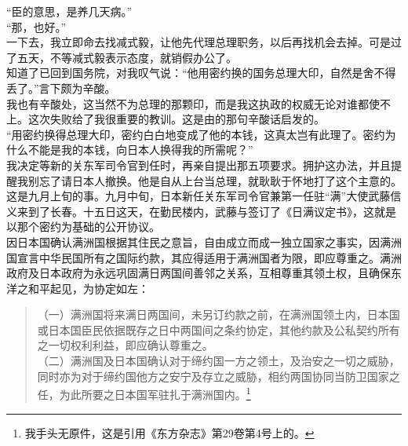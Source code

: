 “臣的意思，是养几天病。”\\

“那，也好。”\\

一下去，我立即命去找减式毅，让他先代理总理职务，以后再找机会去掉。可是过了五天，不等减式毅表示态度，就销假办公了。\\

知道了已回到国务院，对我叹气说：“他用密约换的国务总理大印，自然是舍不得丢了。”言下颇为辛酸。\\

我也有辛酸处，这当然不为总理的那颗印，而是我这执政的权威无论对谁都使不上。这次失败给了我很重要的教训。这是由的那句辛酸话启发的。\\

“用密约换得总理大印，密约白白地变成了他的本钱，这真太岂有此理了。密约为什么不能是我的本钱，向日本人换得我的所需呢？”\\

我决定等新的关东军司令官到任时，再亲自提出那五项要求。拥护这办法，并且提醒我别忘了请日本人撤换。他是自从上台当总理，就耿耿于怀地打了这个主意的。\\

这是九月上旬的事。九月中旬，日本新任关东军司令官兼第一任驻“满”大使武藤信义来到了长春。十五日这天，在勤民楼内，武藤与签订了《日满议定书》，这就是以那个密约为基础的公开协议。\\

因日本国确认满洲国根据其住民之意旨，自由成立而成一独立国家之事实，因满洲国宣言中华民国所有之国际约款，其应得适用于满洲国者为限，即应尊重之。满洲政府及日本政府为永远巩固满日两国间善邻之关系，互相尊重其领土权，且确保东洋之和平起见，为协定如左：\\

\begin{quote}
	（一）满洲国将来满日两国间，未另订约款之前，在满洲国领土内，日本国或日本国臣民依据既存之日中两国间之条约协定，其他约款及公私契约所有之一切权利利益，即应确认尊重之。\\

（二）满洲国及日本国确认对于缔约国一方之领土，及治安之一切之威胁，同时亦为对于缔约国他方之安宁及存立之威胁，相约两国协同当防卫国家之任，为此所要之日本国军驻扎于满洲国内。\footnote{我手头无原件，这是引用《东方杂志》第29卷第4号上的。}\\
\end{quote}

